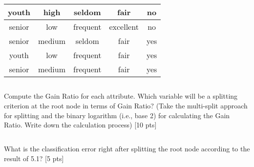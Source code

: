 \documentclass{homework}
\begin{document}
\begin{table}[!h]
\begin{center}
\begin{tabular}{|c|c|c|c|c|}
    youth        & high                                         & seldom                                 & fair                                        & no                                           \\ \hline
    senior       & low                                          & frequent                               & excellent                                   & no                                           \\ \hline
    senior       & medium                                       & seldom                                 & fair                                        & yes                                          \\ \hline
    youth        & low                                          & frequent                               & fair                                        & yes                                          \\ \hline
    senior       & medium                                       & frequent                               & fair                                        & yes                                          \\ \hline
    \end{tabular}
    \end{center}
    \end{table}
    
    \subsection{}
    Compute the Gain Ratio for each attribute. Which variable will be a splitting criterion at the root node in terms of Gain Ratio? (Take the multi-split approach for splitting and the binary logarithm (i.e., base 2) for calculating the Gain Ratio. Write down the calculation process) [10 pts]
    
    \subsection{}
    What is the classification error right after splitting the root node according to the result of 5.1? [5 pts]

 
        
     
  
\end{document}
